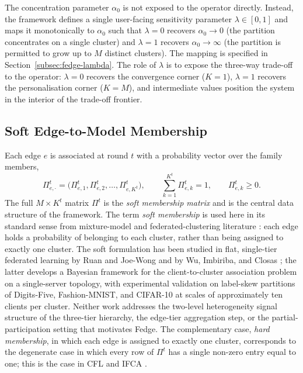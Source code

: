 The concentration parameter $\alpha_0$ is not exposed to the operator directly. Instead, the framework defines a single user-facing sensitivity parameter $\lambda \in [0, 1]$ and maps it monotonically to $\alpha_0$ such that $\lambda = 0$ recovers $\alpha_0 \to 0$ (the partition concentrates on a single cluster) and $\lambda = 1$ recovers $\alpha_0 \to \infty$ (the partition is permitted to grow up to $M$ distinct clusters). The mapping is specified in Section~\ref{subsec:fedge-lambda}. The role of $\lambda$ is to expose the three-way trade-off to the operator: $\lambda = 0$ recovers the convergence corner ($K = 1$), $\lambda = 1$ recovers the personalisation corner ($K = M$), and intermediate values position the system in the interior of the trade-off frontier.

\subsection{Soft Edge-to-Model Membership}
\label{subsec:fedge-soft}

Each edge $e$ is associated at round $t$ with a probability vector over the family members,
\begin{equation}
\label{eq:soft-membership}
\Pi_{e,\cdot}^{t} = \big( \Pi_{e,1}^{t}, \Pi_{e,2}^{t}, \ldots, \Pi_{e,K^{t}}^{t} \big), \qquad \sum_{k=1}^{K^{t}} \Pi_{e,k}^{t} = 1, \qquad \Pi_{e,k}^{t} \geq 0.
\end{equation}
The full $M \times K^t$ matrix $\Pi^t$ is the \emph{soft membership matrix} and is the central data structure of the framework. The term \emph{soft membership} is used here in its standard sense from mixture-model and federated-clustering literature \cite{ruan2022fedsoft, wu2024bayesian}: each edge holds a probability of belonging to each cluster, rather than being assigned to exactly one cluster. The soft formulation has been studied in flat, single-tier federated learning by Ruan and Joe-Wong \cite{ruan2022fedsoft} and by Wu, Imbiriba, and Closas \cite{wu2024bayesian}; the latter develops a Bayesian framework for the client-to-cluster association problem on a single-server topology, with experimental validation on label-skew partitions of Digits-Five, Fashion-MNIST, and CIFAR-10 at scales of approximately ten clients per cluster. Neither work addresses the two-level heterogeneity signal structure of the three-tier hierarchy, the edge-tier aggregation step, or the partial-participation setting that motivates Fedge. The complementary case, \emph{hard membership}, in which each edge is assigned to exactly one cluster, corresponds to the degenerate case in which every row of $\Pi^t$ has a single non-zero entry equal to one; this is the case in CFL \cite{sattler2020clustered} and IFCA \cite{ghosh2022efficient}.

